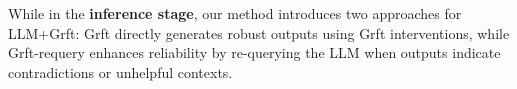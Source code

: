 


While in the \textbf{inference stage}, our method introduces two approaches for LLM+Grft: Grft directly generates robust outputs using Grft interventions, while Grft-requery enhances reliability by re-querying the LLM when outputs indicate contradictions or unhelpful contexts.





